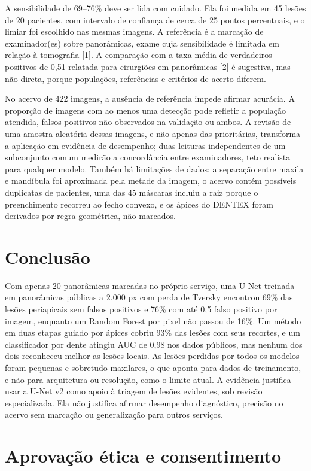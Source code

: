 \documentclass[twocolumn]{article}
\begin{document}
A sensibilidade de 69--76\% deve ser lida com cuidado. Ela foi medida em 45 lesões de 20 pacientes, com intervalo de confiança de cerca de 25 pontos percentuais, e o limiar foi escolhido nas mesmas imagens. A referência é a marcação de  examinador(es) sobre panorâmicas, exame cuja sensibilidade é limitada em relação à tomografia [1]. A comparação com a taxa média de verdadeiros positivos de 0,51 relatada para cirurgiões em panorâmicas [2] é sugestiva, mas não direta, porque populações, referências e critérios de acerto diferem.

No acervo de 422 imagens, a ausência de referência impede afirmar acurácia. A proporção de imagens com ao menos uma detecção pode refletir a população atendida, falsos positivos não observados na validação ou ambos. A revisão de uma amostra aleatória dessas imagens, e não apenas das prioritárias, transforma a aplicação em evidência de desempenho; duas leituras independentes de um subconjunto comum medirão a concordância entre examinadores, teto realista para qualquer modelo. Também há limitações de dados: a separação entre maxila e mandíbula foi aproximada pela metade da imagem, o acervo contém possíveis duplicatas de pacientes, uma das 45 máscaras incluiu a raiz porque o preenchimento recorreu ao fecho convexo, e os ápices do DENTEX foram derivados por regra geométrica, não marcados.

\section{Conclusão}

Com apenas 20 panorâmicas marcadas no próprio serviço, uma U-Net treinada em panorâmicas públicas a 2.000 px com perda de Tversky encontrou 69\% das lesões periapicais sem falsos positivos e 76\% com até 0,5 falso positivo por imagem, enquanto um Random Forest por pixel não passou de 16\%. Um método em duas etapas guiado por ápices cobriu 93\% das lesões com seus recortes, e um classificador por dente atingiu AUC de 0,98 nos dados públicos, mas nenhum dos dois reconheceu melhor as lesões locais. As lesões perdidas por todos os modelos foram pequenas e sobretudo maxilares, o que aponta para dados de treinamento, e não para arquitetura ou resolução, como o limite atual. A evidência justifica usar a U-Net v2 como apoio à triagem de lesões evidentes, sob revisão especializada. Ela não justifica afirmar desempenho diagnóstico, precisão no acervo sem marcação ou generalização para outros serviços.

\section*{Aprovação ética e consentimento}
\end{document}

